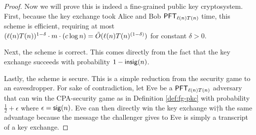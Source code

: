 \begin{proof}
	Now we will prove this is indeed a fine-grained public key cryptosystem. First, because the key exchange took Alice and Bob $\PFT{\ell(n)T(n)}$ time, this scheme is efficient, requiring at most $(\ell(n)T(n))^{1 - \delta} \cdot m \cdot (c \log n) = \~O(\ell(n)T(n)^{(1 - \delta)})$ for constant $\delta > 0$.
	
	Next, the scheme is correct. This comes directly from the fact that the key exchange succeeds with probability $1 - \insig(n)$.
	
	Lastly, the scheme is secure. This is a simple reduction from the security game to an eavesdropper. For sake of contradiction, let Eve be a $\PFT{\ell(n)T(n)}$ adversary that can win the CPA-security game as in Definition \ref{def:fg-pkc} with probability $\frac 1 2 + \epsilon$ where $\epsilon = \sig(n)$. Eve can then directly win the key exchange wi†h the same advantage because the message the challenger gives to Eve is simply a transcript of a key exchange.
\end{proof}

